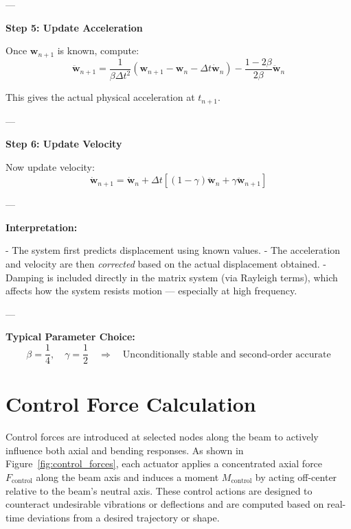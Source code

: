 \documentclass{article}
\begin{document}
	---
	
	\textbf{Step 5: Update Acceleration}
	
	Once \( \mathbf{w}_{n+1} \) is known, compute:
	\begin{equation}
		\ddot{\mathbf{w}}_{n+1} = \frac{1}{\beta \Delta t^2} \left( \mathbf{w}_{n+1} - \mathbf{w}_n - \Delta t \dot{\mathbf{w}}_n \right) - \frac{1 - 2\beta}{2\beta} \ddot{\mathbf{w}}_n
	\end{equation}
	
	This gives the actual physical acceleration at \( t_{n+1} \).
	
	---
	
	\textbf{Step 6: Update Velocity}
	
	Now update velocity:
	\begin{equation}
		\dot{\mathbf{w}}_{n+1} = \dot{\mathbf{w}}_n + \Delta t \left[ (1 - \gamma) \ddot{\mathbf{w}}_n + \gamma \ddot{\mathbf{w}}_{n+1} \right]
	\end{equation}
	
	---
	
	\textbf{Interpretation:}
	
	- The system first predicts displacement using known values.
	- The acceleration and velocity are then \textit{corrected} based on the actual displacement obtained.
	- Damping is included directly in the matrix system (via Rayleigh terms), which affects how the system resists motion — especially at high frequency.
	
	---
	
	\textbf{Typical Parameter Choice:}
	\[
	\beta = \frac{1}{4}, \quad \gamma = \frac{1}{2} \quad \Rightarrow \quad \text{Unconditionally stable and second-order accurate}
	\]
	
	
	
	
	
	
	
	
	
	
	
	
	\section*{Control Force Calculation}
	Control forces are introduced at selected nodes along the beam to actively influence both axial and bending responses. As shown in Figure~\ref{fig:control_forces}, each actuator applies a concentrated axial force \( F_{\text{control}} \) along the beam axis and induces a moment \( M_{\text{control}} \) by acting off-center relative to the beam’s neutral axis. These control actions are designed to counteract undesirable vibrations or deflections and are computed based on real-time deviations from a desired trajectory or shape.
	
\end{document}
